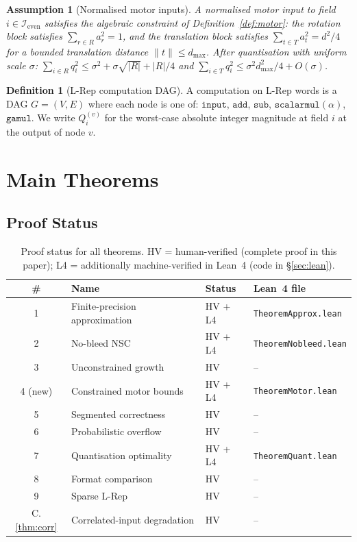 \documentclass[11pt,a4paper]{article}
\theoremstyle{definition}
\newtheorem{definition}{Definition}[section]
\theoremstyle{plain}
\newtheorem{assumption}{Assumption}[section]
\theoremstyle{remark}
\begin{document}
\begin{assumption}[Normalised motor inputs]
\label{ass:motor}
A \emph{normalised motor input} to field $i\in\mathcal{I}_{\mathrm{even}}$
satisfies the algebraic constraint of Definition~\ref{def:motor}:
the rotation block satisfies $\sum_{r\in R}a_r^2=1$,
and the translation block satisfies $\sum_{t\in T}a_t^2=d^2/4$
for a bounded translation distance $\|t\|\le d_{\max}$.
After quantisation with uniform scale $\sigma$:
$\sum_{i\in R}q_i^2\le\sigma^2+\sigma\sqrt{|R|}+|R|/4$
and $\sum_{i\in T}q_i^2\le\sigma^2d_{\max}^2/4+O(\sigma)$.
\end{assumption}

\begin{definition}[L-Rep computation DAG]
A computation on L-Rep words is a DAG $G=(V,E)$ where each node is one
of: $\mathtt{input}$, $\mathtt{add}$, $\mathtt{sub}$,
$\mathtt{scalarmul}(\alpha)$, $\mathtt{gamul}$.
We write $Q_i^{(v)}$ for the worst-case absolute integer magnitude at
field $i$ at the output of node $v$.
\end{definition}

\section{Main Theorems}
\label{sec:main}

\subsection{Proof Status}

\begin{table}[h]
\centering
\caption{Proof status for all theorems.
HV = human-verified (complete proof in this paper);
L4 = additionally machine-verified in Lean~4 (code in \S\ref{sec:lean}).}
\label{tab:proof-status}
\small
\begin{tabular}{clll}
\toprule
\# & Name & Status & Lean~4 file \\
\midrule
1 & Finite-precision approximation & HV + L4 & \texttt{TheoremApprox.lean} \\
2 & No-bleed NSC & HV + L4 & \texttt{TheoremNobleed.lean} \\
3 & Unconstrained growth & HV & -- \\
4 (new) & Constrained motor bounds & HV + L4 & \texttt{TheoremMotor.lean} \\
5 & Segmented correctness & HV & -- \\
6 & Probabilistic overflow & HV & -- \\
7 & Quantisation optimality & HV + L4 & \texttt{TheoremQuant.lean} \\
8 & Format comparison & HV & -- \\
9 & Sparse L-Rep & HV & -- \\
\midrule
C.\ref{thm:corr} & Correlated-input degradation & HV & -- \\
\bottomrule
\end{tabular}
\end{table}
\end{document}
